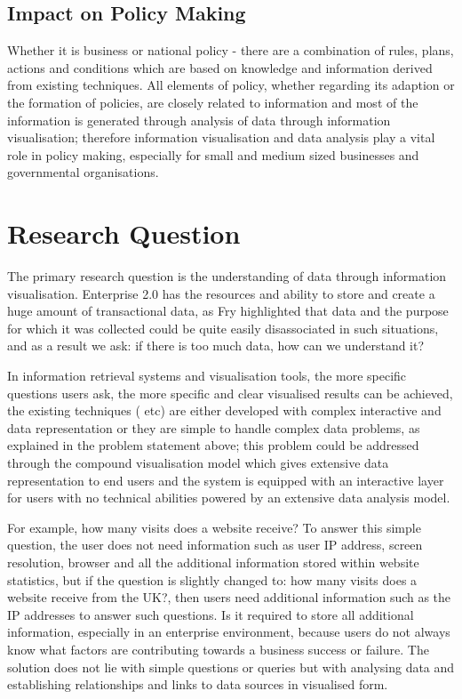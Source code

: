 \subsection{Impact on Policy Making}

Whether it is business or national policy - there are a combination of rules, plans, actions and conditions which are based on knowledge and information derived from existing techniques. All elements of policy, whether regarding its adaption or the formation of policies, are closely related to information and most of the information is generated through analysis of data through information visualisation; therefore information visualisation and data analysis play a vital role in policy making, especially for small and medium sized businesses and governmental organisations.

\section{Research Question}

The primary research question is the understanding of data through information visualisation. Enterprise 2.0 has the resources and ability to store and create a huge amount of transactional data, as Fry \cite{fry} highlighted that data and the purpose for which it was collected could be quite easily disassociated in such situations, and as a result we ask: if there is too much data, how can we understand it? 

In information retrieval systems and visualisation tools, the more specific questions users ask, the more specific and clear visualised results can be achieved, the existing techniques (\cite{7,8,9,eick1999visualizing} etc) are either developed with complex interactive and data representation or they are simple to handle complex data problems, as explained in the  problem statement above; this problem could be addressed through the compound visualisation model which gives extensive data representation to end users and the system is equipped with an interactive layer for users with no technical abilities powered by an extensive data analysis model.

For example, how many visits does a website receive? To answer this simple question, the user does not need information such as user IP address, screen resolution, browser and all the additional information stored within website statistics, but if the question is slightly changed to: how many visits does a website receive from the UK?, then users need additional information such as the IP addresses to answer such questions. Is it required to store all additional information, especially in an enterprise environment, because  users do not always know what factors are contributing towards a business success or failure. The solution does not lie with simple questions or queries but with analysing data and establishing relationships and links to data sources in visualised form.

